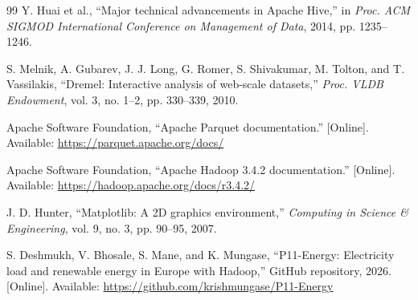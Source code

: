 \documentclass[12pt,a4paper]{report}
\begin{document}
\begin{thebibliography}{99}
 Y. Huai et al., ``Major technical advancements in Apache Hive,'' in \emph{Proc. ACM SIGMOD International Conference on Management of Data}, 2014, pp. 1235--1246.

 S. Melnik, A. Gubarev, J. J. Long, G. Romer, S. Shivakumar, M. Tolton, and T. Vassilakis, ``Dremel: Interactive analysis of web-scale datasets,'' \emph{Proc. VLDB Endowment}, vol. 3, no. 1--2, pp. 330--339, 2010.

 Apache Software Foundation, ``Apache Parquet documentation.'' [Online]. Available: \url{https://parquet.apache.org/docs/}

 Apache Software Foundation, ``Apache Hadoop 3.4.2 documentation.'' [Online]. Available: \url{https://hadoop.apache.org/docs/r3.4.2/}

 J. D. Hunter, ``Matplotlib: A 2D graphics environment,'' \emph{Computing in Science \& Engineering}, vol. 9, no. 3, pp. 90--95, 2007.

 S. Deshmukh, V. Bhosale, S. Mane, and K. Mungase, ``P11-Energy: Electricity load and renewable energy in Europe with Hadoop,'' GitHub repository, 2026. [Online]. Available: \url{https://github.com/krishmungase/P11-Energy}

\end{thebibliography}
\end{document}
